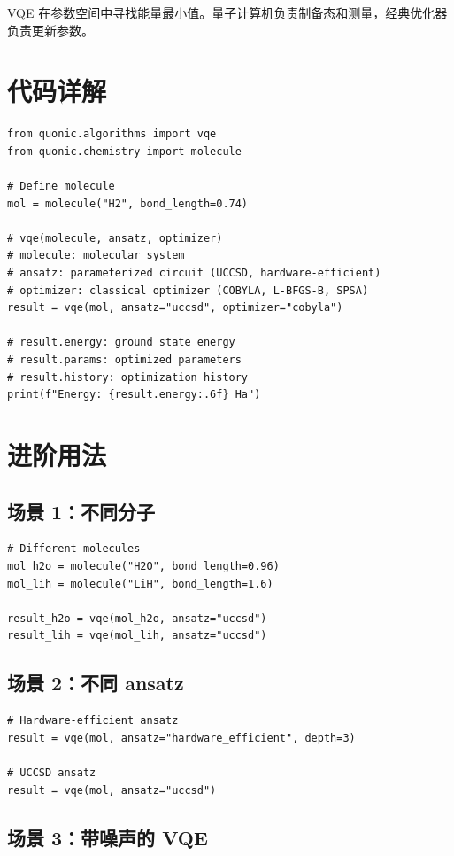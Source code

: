 \documentclass[12pt,a4paper]{article}
\begin{document}
VQE 在参数空间中寻找能量最小值。量子计算机负责制备态和测量，经典优化器负责更新参数。

\section{代码详解}

\begin{lstlisting}[style=python]
from quonic.algorithms import vqe
from quonic.chemistry import molecule

# Define molecule
mol = molecule("H2", bond_length=0.74)

# vqe(molecule, ansatz, optimizer)
# molecule: molecular system
# ansatz: parameterized circuit (UCCSD, hardware-efficient)
# optimizer: classical optimizer (COBYLA, L-BFGS-B, SPSA)
result = vqe(mol, ansatz="uccsd", optimizer="cobyla")

# result.energy: ground state energy
# result.params: optimized parameters
# result.history: optimization history
print(f"Energy: {result.energy:.6f} Ha")
\end{lstlisting}

\section{进阶用法}

\subsection{场景 1：不同分子}

\begin{lstlisting}[style=python]
# Different molecules
mol_h2o = molecule("H2O", bond_length=0.96)
mol_lih = molecule("LiH", bond_length=1.6)

result_h2o = vqe(mol_h2o, ansatz="uccsd")
result_lih = vqe(mol_lih, ansatz="uccsd")
\end{lstlisting}

\subsection{场景 2：不同 ansatz}

\begin{lstlisting}[style=python]
# Hardware-efficient ansatz
result = vqe(mol, ansatz="hardware_efficient", depth=3)

# UCCSD ansatz
result = vqe(mol, ansatz="uccsd")
\end{lstlisting}

\subsection{场景 3：带噪声的 VQE}
\end{document}
